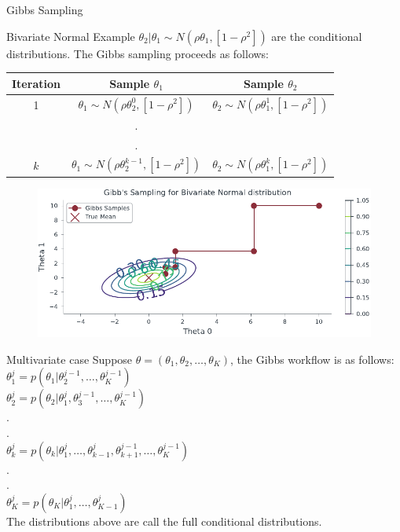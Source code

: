\documentclass{beamer}
\begin{document}
\begin{section}{Gibbs Sampling}
\begin{frame}{Bivariate Normal Example}
    $\theta_2|\theta_1 \sim N(\rho\theta_1,[1-\rho^2])$
    are the conditional distributions.
    The Gibbs sampling proceeds as follows:\\
    \begin{table}[]
        \centering
        \begin{tabular}{c c c}
           Iteration & Sample $\theta_1$ & Sample $\theta_2$\\
           \hline
           1  &  $\theta_1\sim N(\rho\theta_2^0, [1-\rho^2])$ &  $\theta_2\sim N(\rho\theta_1^1, [1-\rho^2])$\\
           & . & \\
           & . & \\
           $k$  &  $\theta_1\sim N(\rho\theta_2^{k-1}, [1-\rho^2])$ &  $\theta_2\sim N(\rho\theta_1^k, [1-\rho^2])$
             
        \end{tabular}
    \end{table}
    \end{frame}

    \begin{frame}
        \begin{figure}
                \centering
                \includegraphics[scale=0.8]{../figures/gibbs_sampling_bivariate_normal.pdf}
            \end{figure}
    \end{frame}

    \begin{frame}{Multivariate case}
        Suppose $\theta = (\theta_1, \theta_2, \ldots, \theta_K)$, the Gibbs workflow is as follows:\\
        $\theta_1^j = p(\theta_1|\theta_2^{j-1}, \ldots, \theta_K^{j-1})$\\
        $\theta_2^j = p(\theta_2|\theta_1^{j}, \theta_3^{j-1}, \ldots, \theta_K^{j-1})$\\
        .\\
        .\\
        $\theta_k^j = p(\theta_k|\theta_1^{j}, \ldots, \theta_{k-1}^j, \theta_{k+1}^{j-1}, \ldots, \theta_K^{j-1})$\\
        .\\
        .\\
        $\theta_K^j = p(\theta_K|\theta_1^{j}, \ldots, \theta_{K-1}^{j})$\\
        The distributions above are call the full conditional distributions.
    \end{frame}


\end{section}
\end{document}
